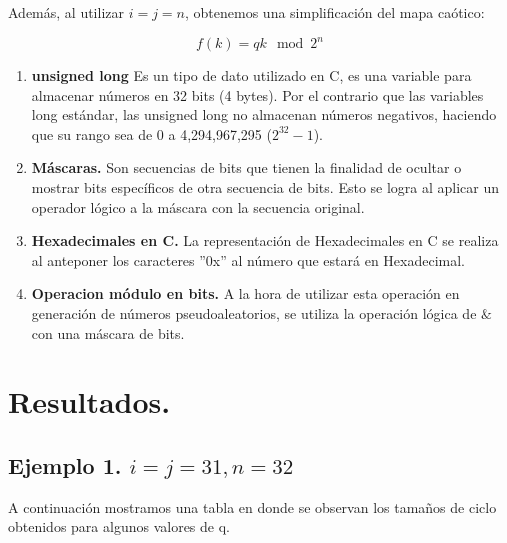 \documentclass[12pt,3p]{elsarticle}
\begin{document}
Además, al utilizar $i=j =n$, obtenemos una simplificación del mapa caótico:

\begin{equation}
f(k)= qk \mod{2^{n}}
\end{equation}
 





\begin{enumerate}
\item \textbf{unsigned long} Es un tipo de dato utilizado en C, es una variable para almacenar números en 32 bits (4 bytes). Por el contrario que las variables long estándar, las unsigned long no almacenan números negativos, haciendo que su rango sea de 0 a 4,294,967,295 ($2^{32} - 1$).


\item \textbf{Máscaras.} Son secuencias de bits que tienen la finalidad de ocultar o mostrar bits específicos de otra secuencia de bits. Esto se logra al aplicar un operador lógico a la máscara con la secuencia original.

\item \textbf{Hexadecimales en C.} La representación de Hexadecimales en C se realiza al anteponer los caracteres ''0x'' al número que estará en Hexadecimal.

\item \textbf{Operacion módulo en bits.} A la hora de utilizar esta operación en generación de números pseudoaleatorios, se utiliza la operación lógica de $ \& $ con una máscara de bits. 

\end{enumerate}

\section{Resultados.}




\subsection{Ejemplo 1. $i=j=31, n=32$}
A continuación mostramos una tabla en donde se observan los tamaños de ciclo obtenidos para algunos valores de q.
\end{document}
